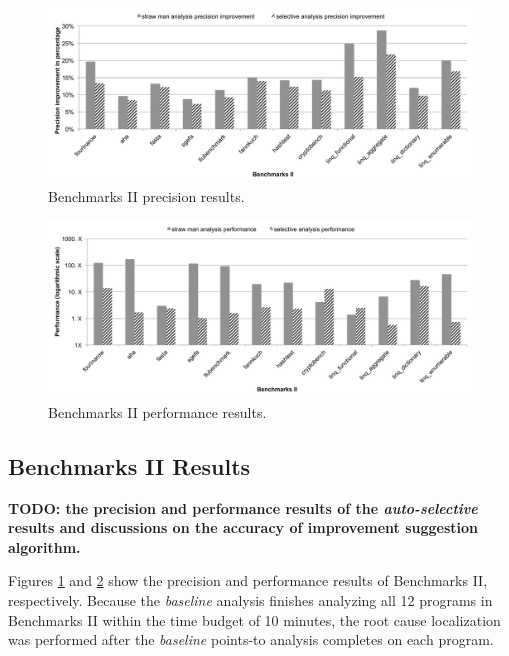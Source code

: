\begin{figure}[th!]
        \includegraphics[width=2\columnwidth]{b2-precision}
\caption{\textmd{Benchmarks II precision results.}}
\vspace{-6pt}
\label{fig:b2-precision}
\end{figure}

\begin{figure}[th!]
        \includegraphics[width=2\columnwidth]{b2-performance}
\caption{\textmd{Benchmarks II performance results.}}
\vspace{-6pt}
\label{fig:b2-performance}
\end{figure}

\subsection{Benchmarks II Results}
\label{b2-res}

{\bf TODO: the precision and performance results of the {\it auto-selective} results and discussions on the accuracy of improvement suggestion algorithm.}

Figures \ref{fig:b2-precision} and \ref{fig:b2-performance} show the precision and performance results of Benchmarks II, respectively. Because the {\it baseline} analysis finishes analyzing all 12 programs in Benchmarks II within the time budget of 10 minutes, the root cause localization was performed after the {\it baseline} points-to analysis completes on each program.

